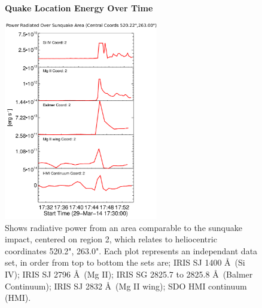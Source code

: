 \begin{figure}[H]
  \begin{center}
  \textbf{Quake Location Energy Over Time}\par\medskip
  \includegraphics[width=0.6\textwidth]{29-Mar-14-Ribbon-Area-2-Sunquake-Area-Power-Ladder}
  \end{center}
  \caption{Shows radiative power from an area comparable to the sunquake impact, centered on region 2, which relates to heliocentric coordinates 520.2", 263.0". Each plot represents an independant data set, in order from top to bottom the sets are; IRIS SJ 1400 \AA\ (Si IV); IRIS SJ 2796 \AA\ (Mg II); IRIS SG  2825.7 to 2825.8 \AA\ (Balmer Continuum); IRIS SJ 2832 \AA\ (Mg II wing); SDO HMI continuum (HMI).}\label{plot2}
\end{figure}


